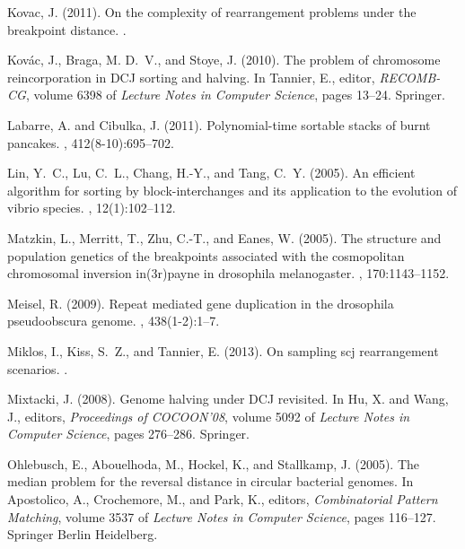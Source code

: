 \documentclass[11pt,final,twoside,nofrench]{thlifl}
\begin{document}
\begin{thebibliography}{}
Kovac, J. (2011).
\newblock On the complexity of rearrangement problems under the breakpoint
  distance.
.

Kov{\'a}c, J., Braga, M. D.~V., and Stoye, J. (2010).
\newblock The problem of chromosome reincorporation in {DCJ} sorting and
  halving.
\newblock In Tannier, E., editor, {\em RECOMB-CG}, volume 6398 of {\em Lecture
  Notes in Computer Science}, pages 13--24. Springer.

Labarre, A. and Cibulka, J. (2011).
\newblock Polynomial-time sortable stacks of burnt pancakes.
, 412(8-10):695--702.

Lin, Y.~C., Lu, C.~L., Chang, H.-Y., and Tang, C.~Y. (2005).
\newblock An efficient algorithm for sorting by block-interchanges and its
  application to the evolution of vibrio species.
, 12(1):102--112.

Matzkin, L., Merritt, T., Zhu, C.-T., and Eanes, W. (2005).
\newblock The structure and population genetics of the breakpoints associated
  with the cosmopolitan chromosomal inversion in(3r)payne in drosophila
  melanogaster.
, 170:1143--1152.

Meisel, R. (2009).
\newblock Repeat mediated gene duplication in the drosophila pseudoobscura
  genome.
, 438(1-2):1--7.

Miklos, I., Kiss, S.~Z., and Tannier, E. (2013).
\newblock On sampling scj rearrangement scenarios.
.

Mixtacki, J. (2008).
\newblock Genome halving under {DCJ} revisited.
\newblock In Hu, X. and Wang, J., editors, {\em Proceedings of COCOON'08},
  volume 5092 of {\em Lecture Notes in Computer Science}, pages 276--286.
  Springer.

Ohlebusch, E., Abouelhoda, M., Hockel, K., and Stallkamp, J. (2005).
\newblock The median problem for the reversal distance in circular bacterial
  genomes.
\newblock In Apostolico, A., Crochemore, M., and Park, K., editors, {\em
  Combinatorial Pattern Matching}, volume 3537 of {\em Lecture Notes in
  Computer Science}, pages 116--127. Springer Berlin Heidelberg.


\end{thebibliography}
\end{document}
